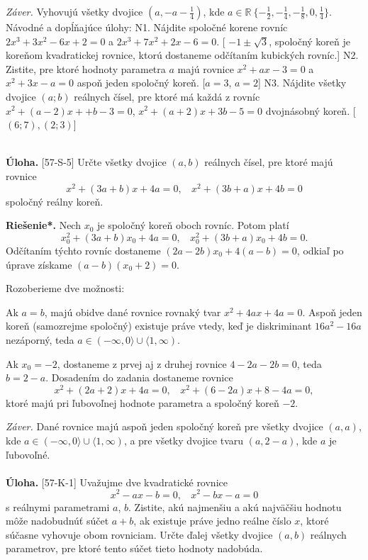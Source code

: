 \documentclass[11pt,a4paper,oneside,final]{book}
\newcommand{\RR}{\mathbb{R}}
\newcommand{\ul}{\textbf{Úloha.} }
\newcommand{\rieh}{\textbf{Riešenie*.} }
\begin{document}
\textit{Záver.} Vyhovujú všetky dvojice $(a, -a - \frac{1}{4})$, kde $a \in \RR \ \{-\frac{1}{2}, -\frac{1}{4}, -\frac{1}{8}, 0, \frac{1}{4}\}$.\\

Návodné a dopĺňajúce úlohy:
N1. Nájdite spoločné korene rovníc $2x^3 + 3x^2-6x + 2 = 0$ a $2x^3 + 7x^2 + 2x-6 = 0$.
[ $-1\pm\sqrt{3}$, spoločný koreň je koreňom kvadratickej rovnice, ktorú dostaneme odčítaním
kubických rovníc.]
N2. Zistite, pre ktoré hodnoty parametra $a$ majú rovnice $x^2 + ax-3 = 0$ a $x^2 + 3x-a = 0$
aspoň jeden spoločný koreň. [$a = 3$, $a =   2$]
N3. Nájdite všetky dvojice $(a; b)$ reálnych čísel, pre ktoré má každá z rovníc $x^2 +(a-2)x+
+ b-3 = 0$, $x^2 + (a + 2)x + 3b-5 = 0$ dvojnásobný koreň. [$(6; 7), (2; 3)$]\\
\\
\begin{tcolorbox}[breakable,notitle,boxrule=0pt,colback=light-gray,colframe=light-gray]\ul [57-S-5]
Určte všetky dvojice $(a, b)$ reálnych čísel, pre ktoré majú rovnice
$$x^2 + (3a + b)x + 4a = 0, \ \ \ \  x^2 + (3b + a)x + 4b = 0$$
spoločný reálny koreň.

\end{tcolorbox}

\rieh Nech $x_0$ je spoločný koreň oboch rovníc. Potom platí
$$x_0^2+ (3a + b)x_0 + 4a = 0, \ \ \ \  x_0^2+ (3b + a)x_0 + 4b = 0.$$
Odčítaním týchto rovníc dostaneme $(2a-2b)x_0 +4(a-b) = 0$, odkiaľ po úprave získame $(a - b)(x_0 + 2) = 0$.

Rozoberieme dve možnosti:

Ak $a = b$, majú obidve dané rovnice rovnaký tvar $x^2 + 4ax + 4a = 0$. Aspoň jeden koreň (samozrejme spoločný) existuje práve vtedy, keď je diskriminant $16a^2-16a$ nezáporný, teda $a \in (-\infty, 0\rangle \cup \langle 1, \infty)$.

Ak $x_0 = -2$, dostaneme z prvej aj z druhej rovnice $4-2a-2b = 0$, teda $b = 2-a$. Dosadením do zadania dostaneme rovnice
$$x^2 + (2a + 2)x + 4a = 0, \ \ \ \ x^2 + (6-2a)x + 8-4a = 0,$$
ktoré majú pri ľubovoľnej hodnote parametra a spoločný koreň $-2$.

\textit{Záver.} Dané rovnice majú aspoň jeden spoločný koreň pre všetky dvojice $(a, a)$, kde $a \in (-\infty, 0\rangle \cup \langle 1, \infty)$, a pre všetky dvojice tvaru $(a, 2-a)$, kde $a$ je ľubovoľné.\\
\\\ul [57-K-1]  Uvažujme dve kvadratické rovnice
$$x^2-ax-b = 0,\ \ \ \  x^2-bx-a = 0$$
s reálnymi parametrami $a$, $b$. Zistite, akú najmenšiu a akú najväčšiu hodnotu môže nadobudnúť súčet $a + b$, ak existuje práve jedno reálne číslo $x$, ktoré súčasne vyhovuje obom rovniciam. Určte ďalej všetky dvojice $(a, b)$ reálnych parametrov, pre ktoré tento súčet tieto hodnoty nadobúda.
\end{document}
